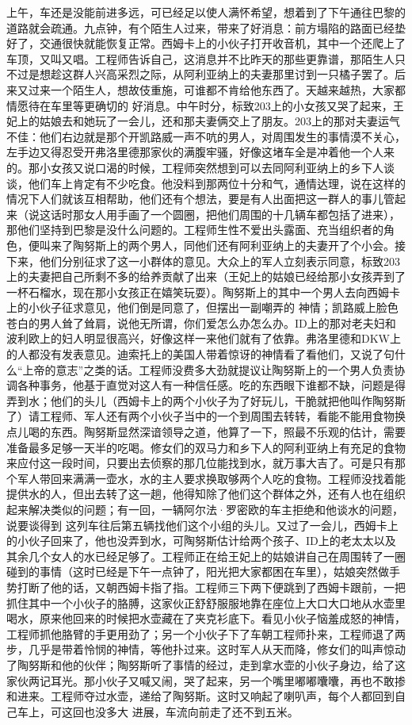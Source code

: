 \documentclass{article}
\begin{document}
上午，车还是没能前进多远，可已经足以使人满怀希望，想着到了下午通往巴黎的道路就会疏通。九点钟，有个陌生人过来，带来了好消息：前方塌陷的路面已经垫好了，交通很快就能恢复正常。西姆卡上的小伙子打开收音机，其中一个还爬上了车顶，又叫又唱。工程师告诉自己，这消息并不比昨天的那些更靠谱，那陌生人只不过是想趁这群人兴高采烈之际，从阿利亚纳上的夫妻那里讨到一只橘子罢了。后来又过来一个陌生人，想故伎重施，可谁都不肯给他东西了。天越来越热，大家都情愿待在车里等更确切的
\newpage
好消息。中午时分，标致203上的小女孩又哭了起来，王妃上的姑娘去和她玩了一会儿，还和那夫妻俩交上了朋友。203上的那对夫妻运气不佳：他们右边就是那个开凯路威一声不吭的男人，对周围发生的事情漠不关心，左手边又得忍受开弗洛里德那家伙的满腹牢骚，好像这堵车全是冲着他一个人来的。那小女孩又说口渴的时候，工程师突然想到可以去同阿利亚纳上的乡下人谈谈，他们车上肯定有不少吃食。他没料到那两位十分和气，通情达理，说在这样的情况下人们就该互相帮助，他们还有个想法，要是有人出面把这一群人的事儿管起来（说这话时那女人用手画了一个圆圈，把他们周围的十几辆车都包括了进来），那他们坚持到巴黎是没什么问题的。工程师生性不爱出头露面、充当组织者的角色，便叫来了陶努斯上的两个男人，同他们还有阿利亚纳上的夫妻开了个小会。接下来，他们分别征求了这一小群体的意见。大众上的军人立刻表示同意，标致203上的夫妻把自己所剩不多的给养贡献了出来（王妃上的姑娘已经给那小女孩弄到了一杯石榴水，现在那小女孩正在嬉笑玩耍）。陶努斯上的其中一个男人去向西姆卡上的小伙子征求意见，他们倒是同意了，但摆出一副嘲弄的
\newpage
神情；凯路威上脸色苍白的男人耸了耸肩，说他无所谓，你们爱怎么办怎么办。ID上的那对老夫妇和波利欧上的妇人明显很高兴，好像这样一来他们就有了依靠。弗洛里德和DKW上的人都没有发表意见。迪索托上的美国人带着惊讶的神情看了看他们，又说了句什么“上帝的意志”之类的话。工程师没费多大劲就提议让陶努斯上的一个男人负责协调各种事务，他基于直觉对这人有一种信任感。吃的东西眼下谁都不缺，问题是得弄到水；他们的头儿（西姆卡上的两个小伙子为了好玩儿，干脆就把他叫作陶努斯了）请工程师、军人还有两个小伙子当中的一个到周围去转转，看能不能用食物换点儿喝的东西。陶努斯显然深谙领导之道，他算了一下，照最不乐观的估计，需要准备最多足够一天半的吃喝。修女们的双马力和乡下人的阿利亚纳上有充足的食物来应付这一段时间，只要出去侦察的那几位能找到水，就万事大吉了。可是只有那个军人带回来满满一壶水，水的主人要求换取够两个人吃的食物。工程师没找着能提供水的人，但出去转了这一趟，他得知除了他们这个群体之外，还有人也在组织起来解决类似的问题；有一回，一辆阿尔法·罗密欧的车主拒绝和他谈水的问题，说要谈得到
\newpage
这列车往后第五辆找他们这个小组的头儿。又过了一会儿，西姆卡上的小伙子回来了，他也没弄到水，可陶努斯估计给两个孩子、ID上的老太太以及其余几个女人的水已经足够了。工程师正在给王妃上的姑娘讲自己在周围转了一圈碰到的事情（这时已经是下午一点钟了，阳光把大家都困在车里），姑娘突然做手势打断了他的话，又朝西姆卡指了指。工程师三下两下便跳到了西姆卡跟前，一把抓住其中一个小伙子的胳膊，这家伙正舒舒服服地靠在座位上大口大口地从水壶里喝水，原来他回来的时候把水壶藏在了夹克衫底下。看见小伙子恼羞成怒的神情，工程师抓他胳臂的手更用劲了；另一个小伙子下了车朝工程师扑来，工程师退了两步，几乎是带着怜悯的神情，等他扑过来。这时军人从天而降，修女们的叫声惊动了陶努斯和他的伙伴；陶努斯听了事情的经过，走到拿水壶的小伙子身边，给了这家伙两记耳光。那小伙子又喊又闹，哭了起来，另一个嘴里嘟嘟囔囔，再也不敢掺和进来。工程师夺过水壶，递给了陶努斯。这时又响起了喇叭声，每个人都回到自己车上，可这回也没多大
进展，车流向前走了还不到五米。 
\end{document}
